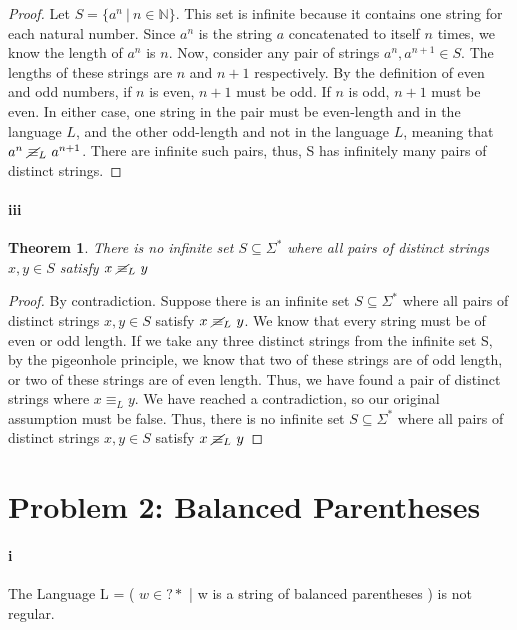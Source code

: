 \documentclass[10pt,letter]{article}
\newtheorem*{thm}{Theorem}
\begin{document}
\begin{proof}
Let $S= \{a^n\ |\ n \in \mathbb{N}\}$. This set is infinite because it contains one string for each natural number. Since $a^n$ is the string $a$ concatenated to itself $n$ times, we know the length of $a^n$ is $n$. Now, consider any pair of strings $a^n, a^{n+1} \in S$. The lengths of these strings are $n$ and $n+1$ respectively. By the definition of even and odd numbers, if $n$ is even, $n+1$ must be odd. If $n$ is odd, $n+1$ must be even. In either case, one string in the pair must be even-length and in the language $L$, and the other odd-length and not in the language $L$, meaning that $a^n\ \cancel{\equiv}_L\ a^{n+1}$. There are infinite such pairs, thus, S has infinitely many pairs of distinct strings.
\end{proof}

\paragraph{iii}
\begin{thm} There is no infinite set $S \subseteq \Sigma^*$ where all pairs of distinct strings $x,y\in S$ satisfy $x\ \cancel{\equiv}_L\ y$ \end{thm}

\begin{proof}
By contradiction. Suppose there is an infinite set $S \subseteq \Sigma^*$ where all pairs of distinct strings $x,y \in S$ satisfy $x\ \cancel{\equiv}_L\ y$. We know that every string must be of even or odd length. If we take any three distinct strings from the infinite set S, by the pigeonhole principle, we know that two of these strings are of odd length, or two of these strings are of even length. Thus, we have found a pair of distinct strings where $x \equiv_L y$. We have reached a contradiction, so our original assumption must be false. Thus, there is no infinite set $S \subseteq \Sigma^*$ where all pairs of distinct strings $x,y\in S$ satisfy $x\ \cancel{\equiv}_L\ y$
\end{proof}

\section*{Problem 2: Balanced Parentheses}
\paragraph{i}
\thm The Language L = ( $w \in ?*$ | w is a string of balanced parentheses ) is not regular. 
\end{document}
